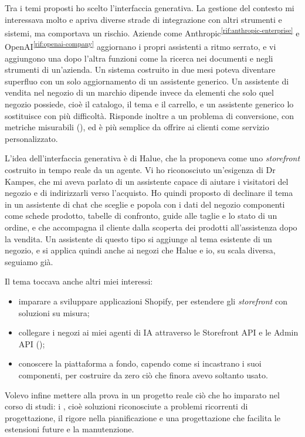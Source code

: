 Tra i temi proposti ho scelto l’interfaccia generativa. La gestione del contesto mi interessava
molto e apriva diverse strade di integrazione con altri strumenti e sistemi, ma comportava un
rischio. Aziende come Anthropic\textsuperscript{\ref{rif:anthropic-enterprise}} e
OpenAI\textsuperscript{\ref{rif:openai-company}} aggiornano i propri assistenti a ritmo serrato, e
vi aggiungono una dopo l’altra funzioni come la ricerca nei documenti e negli strumenti di
un’azienda. Un sistema costruito in due mesi poteva diventare superfluo con un solo aggiornamento di
un assistente generico. Un assistente di vendita nel negozio di un marchio dipende invece da
elementi che solo quel negozio possiede, cioè il catalogo, il tema e il carrello, e un assistente
generico lo sostituisce con più difficoltà. Risponde inoltre a un problema di conversione, con
metriche misurabili (), ed è più semplice da offrire ai clienti come
servizio personalizzato.

L’idea dell’interfaccia generativa è di Halue, che la proponeva come uno \emph{storefront}
costruito in tempo reale da un agente. Vi ho riconosciuto un’esigenza di Dr Kampes, che mi aveva
parlato di un assistente capace di aiutare i visitatori del negozio e di indirizzarli verso
l’acquisto. Ho quindi proposto di declinare il tema in un assistente di chat che sceglie e popola
con i dati del negozio componenti come schede prodotto, tabelle di confronto, guide alle taglie e
lo stato di un ordine, e che accompagna il cliente dalla scoperta dei prodotti all’assistenza dopo
la vendita. Un assistente di questo tipo si aggiunge al tema esistente di un negozio, e si applica
quindi anche ai negozi che Halue e io, su scala diversa, seguiamo già.

Il tema toccava anche altri miei interessi:

\begin{itemize}
	\item imparare a sviluppare applicazioni Shopify, per estendere gli \emph{storefront} con
	soluzioni su misura;
	\item collegare i negozi ai miei agenti di IA attraverso le Storefront API e le Admin API
	();
	\item conoscere la piattaforma a fondo, capendo come si incastrano i suoi componenti, per
	costruire da zero ciò che finora avevo soltanto usato.
\end{itemize}

Volevo infine mettere alla prova in un progetto reale ciò che ho imparato nel corso di studi: i
, cioè soluzioni riconosciute a problemi ricorrenti di
progettazione, il rigore nella pianificazione e una progettazione che facilita le estensioni future
e la manutenzione.


